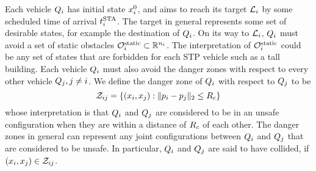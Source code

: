 

Each vehicle $Q_i$ has initial state $x^0_i$, and aims to reach its target $\mathcal{L}_i$ by some scheduled time of arrival $t^\text{STA}_i$.  The target in general represents some set of desirable states, for example the destination of $Q_i$. %
On its way to $\mathcal{L}_i$, $Q_i$ must avoid a set of static obstacles $\mathcal{O}^\text{static}_i \subset \mathbb{R}^{n_i}$. The interpretation of $\mathcal{O}^\text{static}_i$ could be any set of states that are forbidden for each STP vehicle such as a tall building. Each vehicle $Q_i$ must also avoid the danger zones with respect to every other vehicle $Q_j, j\neq i$. We define the danger zone of $Q_i$ with respect to $Q_j$ to be
\begin{equation} \label{eqn:danger_zone_defn}
\dz_{ij} = \{(\state_i, \state_j): \|\pos_i - \pos_j\|_2 \le \rc\}
\end{equation}
\noindent whose interpretation is that $Q_i$ and $Q_j$ are considered to be in an unsafe configuration when they are within a distance of $R_c$ of each other. The danger zones in general can represent any joint configurations between $Q_i$ and $Q_j$ that are considered to be unsafe. In particular, $Q_i$ and $Q_j$ are said to have collided, if $(x_i, x_j) \in \mathcal{Z}_{ij}$.

